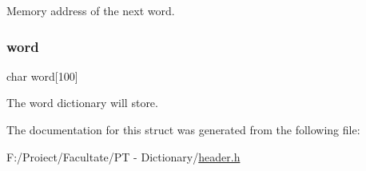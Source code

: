 Memory address of the next word. \mbox{\label{structdictionary_ae8e3e053e32bc6c0ab4a48ba064bb994}} 
\subsubsection{\texorpdfstring{word}{word}}
{\footnotesize\ttfamily char word\mbox{[}100\mbox{]}}

The word dictionary will store. 

The documentation for this struct was generated from the following file\+:\begin{DoxyCompactItemize}
\item 
F\+:/\+Proiect/\+Facultate/\+P\+T -\/ Dictionary/\hyperlink{header_8h}{header.\+h}\end{DoxyCompactItemize}
